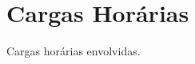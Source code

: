 \documentclass[a4]{ppc-ufscar}
\begin{document}
\begin{itemize}
\end{itemize}


%


\section{Cargas Horárias}
Cargas horárias envolvidas.
\end{document}
